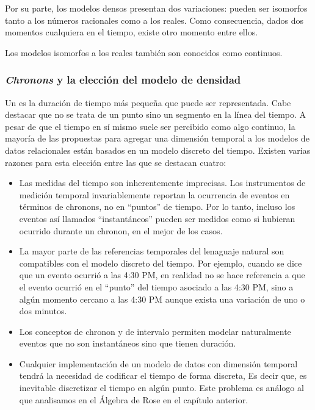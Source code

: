 Por su parte, los modelos densos presentan dos variaciones: pueden ser isomorfos tanto a los números racionales como a los reales.
Como consecuencia, dados dos momentos cualquiera en el tiempo, existe otro momento entre ellos.

Los modelos isomorfos a los reales también son conocidos como continuos.

\subsubsection{\textit{Chronons} y la elección del modelo de densidad}

Un  es la duración de tiempo más pequeña que puede ser representada.
Cabe destacar que no se trata de un punto sino un segmento en la línea del tiempo.
A pesar de que el tiempo en sí mismo suele ser percibido como algo continuo,
la mayoría de las propuestas para agregar una dimensión temporal a los modelos de datos relacionales están basados en un modelo discreto del tiempo.
Existen varias razones para esta elección entre las que se destacan cuatro:

\begin{itemize}
    \item Las medidas del tiempo son inherentemente imprecisas.
    Los instrumentos de medición temporal invariablemente reportan la ocurrencia de eventos en términos de chronons, no en “puntos” de tiempo.
    Por lo tanto, incluso los eventos así llamados “instantáneos” pueden ser medidos como si hubieran ocurrido durante un chronon, en el mejor de los casos.
    \item La mayor parte de las referencias temporales del lenaguaje natural son compatibles con el modelo discreto del tiempo.
    Por ejemplo, cuando se dice que un evento ocurrió a las 4:30 PM,
    en realidad no se hace referencia a que el evento ocurrió en el “punto” del tiempo asociado a las 4:30 PM,
    sino a algún momento cercano a las 4:30 PM aunque exista una variación de uno o dos minutos.
    \item Los conceptos de chronon y de intervalo permiten modelar naturalmente eventos que no son instantáneos sino que tienen duración.
    \item Cualquier implementación de un modelo de datos con dimensión temporal tendrá la necesidad de codificar el tiempo de forma discreta,
    Es decir que, es inevitable discretizar el tiempo en algún punto.
    Este problema es análogo al que analisamos en el Álgebra de Rose en el capítulo anterior.
\end{itemize}

